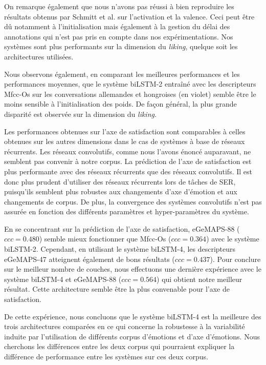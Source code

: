 On remarque également que nous n'avons pas réussi à bien reproduire les résultats obtenus par Schmitt et al. sur l'activation et la valence. Ceci peut être dû notamment à l'initialisation mais également à la gestion du délai des annotations qui n'est pas pris en compte dans nos expérimentations. Nos systèmes sont plus performants sur la dimension du \textit{liking}, quelque soit les architectures utilisées.

Nous observons également, en comparant les meilleures performances et les performances moyennes, que le système biLSTM-2 entraîné avec les descripteurs Mfcc-Os sur les conversations allemandes et hongroises (en violet) semble être le moins sensible à l'initialisation des poids. De façon général, la plus grande disparité est observée sur la dimension du \textit{liking}.

Les performances obtenues sur l'axe de satisfaction sont comparables à celles obtenues sur les autres dimensions dans le cas de systèmes à base de réseaux récurrents. Les réseaux convolutifs, comme nous l'avons énoncé auparavant, ne semblent pas convenir à notre corpus. La prédiction de l'axe de satisfaction est plus performante avec des réseaux récurrents que des réseaux convolutifs. Il est donc plus prudent d'utiliser des réseaux récurrents lors de tâches de SER, puisqu'ils semblent plus robustes aux changements d'axe d'émotion et aux changements de corpus. De plus, la convergence des systèmes convolutifs n'est pas assurée en fonction des différents paramètres et hyper-paramètres du système.

En se concentrant sur la prédiction de l'axe de satisfaction, eGeMAPS-88 ($ccc=0.480$) semble mieux fonctionner que Mfcc-Os ($ccc=0.364$) avec le système biLSTM-2. Cependant, en utilisant le système biLSTM-4, les descripteurs eGeMAPS-47 atteignent également de bons résultats ($ccc=0.437$). Pour conclure sur le meilleur nombre de couches, nous effectuons une dernière expérience avec le système biLSTM-4 et eGeMAPS-88 ($ccc=0.564$) qui obtient notre meilleur résultat. Cette architecture semble être la plus convenable pour l'axe de satisfaction.

De cette expérience, nous concluons que le système biLSTM-4 est la meilleure des trois architectures comparées en ce qui concerne la robustesse à la variabilité induite par l'utilisation de différents corpus d'émotions et d'axe d'émotions. Nous cherchons les différences entre les deux corpus qui pourraient expliquer la différence de performance entre les systèmes sur ces deux corpus.

